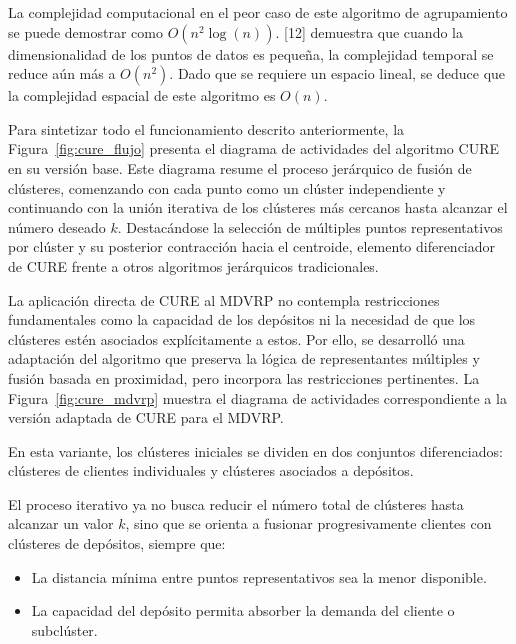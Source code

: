 La complejidad computacional en el peor caso de este algoritmo de agrupamiento se puede demostrar como $O(n^{2}\log(n))$. [12] demuestra que cuando la dimensionalidad de los puntos de datos es peque\~na, la complejidad temporal se reduce a\'un m\'as a $O(n^{2})$. Dado que se requiere un espacio lineal, se deduce que la complejidad espacial de este algoritmo es $O(n)$.

Para sintetizar todo el funcionamiento descrito anteriormente, la Figura~\ref{fig:cure_flujo} presenta el diagrama de actividades del algoritmo CURE en su versi\'on base. Este diagrama resume el proceso jer\'arquico de fusi\'on de cl\'usteres, comenzando con cada punto como un cl\'uster independiente y continuando con la uni\'on iterativa de los cl\'usteres m\'as cercanos hasta alcanzar el n\'umero deseado $k$. Destac\'andose la selecci\'on de m\'ultiples puntos representativos por cl\'uster y su posterior contracci\'on hacia el centroide, elemento diferenciador de CURE frente a otros algoritmos jer\'arquicos tradicionales.


La aplicaci\'on directa de CURE al MDVRP no contempla restricciones fundamentales como la capacidad de los dep\'ositos ni la necesidad de que los cl\'usteres est\'en asociados expl\'icitamente a estos. Por ello, se desarroll\'o una adaptaci\'on del algoritmo que preserva la l\'ogica de representantes m\'ultiples y fusi\'on basada en proximidad, pero incorpora las restricciones pertinentes. La Figura~\ref{fig:cure_mdvrp} muestra el diagrama de actividades correspondiente a la versi\'on adaptada de CURE para el MDVRP.


En esta variante, los cl\'usteres iniciales se dividen en dos conjuntos diferenciados: cl\'usteres de clientes individuales y cl\'usteres asociados a dep\'ositos.

El proceso iterativo ya no busca reducir el n\'umero total de cl\'usteres hasta alcanzar un valor $k$, sino que se orienta a fusionar progresivamente clientes con cl\'usteres de dep\'ositos, siempre que:

\begin{itemize}
  \item La distancia m\'inima entre puntos representativos sea la menor disponible.
  \item La capacidad del dep\'osito permita absorber la demanda del cliente o subcl\'uster.
\end{itemize}

